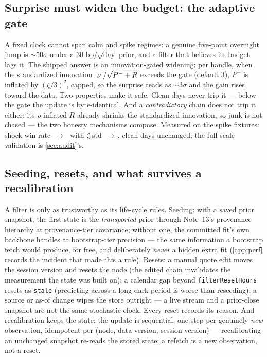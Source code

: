 \documentclass[11pt]{article}
\begin{document}
\subsection{Surprise must widen the budget: the adaptive gate}
\label{sec:adaptive}

A fixed clock cannot span calm and spike regimes: a genuine five-point
overnight jump is ${\sim}50\sigma$ under a $30$ bp$/\sqrt{\text{day}}$
prior, and a filter that believes its budget lags it.  The shipped
answer is an innovation-gated widening: per handle, when the
standardized innovation $\lvert\nu\rvert/\sqrt{P^-+R}$ exceeds the gate
(default $3$), $P^-$ is inflated by $(\zeta/3)^2$, capped, so the
surprise reads as ${\sim}3\sigma$ and the gain rises toward the data.
Two properties make it safe.  Clean days never trip it --- below the
gate the update is byte-identical.  And a \emph{contradictory} chain
does not trip it either: its $\rho$-inflated $R$ already shrinks the
standardized innovation, so junk is not chased --- the two honesty
mechanisms compose.  Measured on the spike fixtures: shock win rate
\ktrsglshockwinbefore$\,\to\,$\ktrsglshockwinafter\ with $\zeta$ std
\ktrsglzetabefore$\,\to\,$\ktrsglzetaafter, clean days unchanged; the
full-scale validation is \cref{sec:audit}'s.

\subsection{Seeding, resets, and what survives a recalibration}
\label{sec:lifecycle}

A filter is only as trustworthy as its life-cycle rules.  Seeding: with
a saved prior snapshot, the first state is the \emph{transported} prior
through Note~13's provenance hierarchy at provenance-tier covariance;
without one, the committed fit's own backbone handles at bootstrap-tier
precision --- the same information a bootstrap fetch would produce, for
free, and deliberately \emph{never} a hidden extra fit
(\cref{app:perf} records the incident that made this a rule).  Resets:
a manual quote edit moves the session version and resets the node (the
edited chain invalidates the measurement the state was built on); a
calendar gap beyond \texttt{filterResetHours} resets as \texttt{stale}
(predicting across a long dark period is worse than reseeding); a source
or as-of change wipes the store outright --- a live stream and a
prior-close snapshot are not the same stochastic clock.  Every reset
records its reason.  And recalibration keeps the state: the update is
sequential, one step per genuinely \emph{new} observation, idempotent
per (node, data version, session version) --- recalibrating an unchanged
snapshot re-reads the stored state; a refetch is a new observation, not
a reset.
\end{document}
